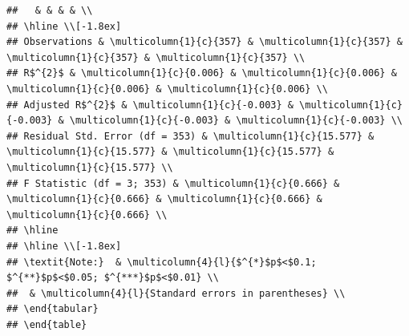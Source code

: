 \documentclass[
  12pt,
  landscape]{article}
\begin{document}
\begin{verbatim}
##   & & & & \\ 
## \hline \\[-1.8ex] 
## Observations & \multicolumn{1}{c}{357} & \multicolumn{1}{c}{357} & \multicolumn{1}{c}{357} & \multicolumn{1}{c}{357} \\ 
## R$^{2}$ & \multicolumn{1}{c}{0.006} & \multicolumn{1}{c}{0.006} & \multicolumn{1}{c}{0.006} & \multicolumn{1}{c}{0.006} \\ 
## Adjusted R$^{2}$ & \multicolumn{1}{c}{-0.003} & \multicolumn{1}{c}{-0.003} & \multicolumn{1}{c}{-0.003} & \multicolumn{1}{c}{-0.003} \\ 
## Residual Std. Error (df = 353) & \multicolumn{1}{c}{15.577} & \multicolumn{1}{c}{15.577} & \multicolumn{1}{c}{15.577} & \multicolumn{1}{c}{15.577} \\ 
## F Statistic (df = 3; 353) & \multicolumn{1}{c}{0.666} & \multicolumn{1}{c}{0.666} & \multicolumn{1}{c}{0.666} & \multicolumn{1}{c}{0.666} \\ 
## \hline 
## \hline \\[-1.8ex] 
## \textit{Note:}  & \multicolumn{4}{l}{$^{*}$p$<$0.1; $^{**}$p$<$0.05; $^{***}$p$<$0.01} \\ 
##  & \multicolumn{4}{l}{Standard errors in parentheses} \\ 
## \end{tabular} 
## \end{table}
\end{verbatim}
\end{document}
